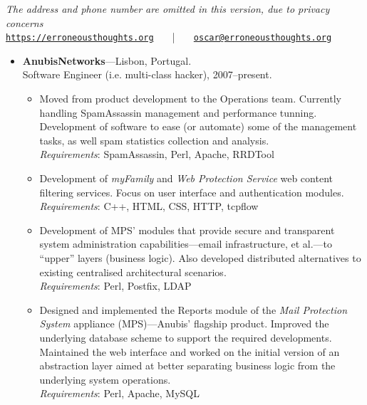 \documentclass[a4paper,9pt]{extarticle}
\newenvironment{topic}[1]
   {{\noindent\large\bfseries\raisebox{0pt}[\height][1ex]{#1}\hrule}%
    \begin{list}{}{%
       \setlength{\leftmargin}{.25cm}}%
    \item[]}
   {\end{list}\medskip}
\newenvironment{header}[1]
   {\centering{\noindent\large\bfseries\raisebox{0pt}[\height][1ex]{\LARGE\bfseries #1}\hrule}%
    \begin{center}}
   {\end{center}\medskip}
\begin{document}
\begin{header}
{Óscar Francisco Godinho Pereira} 
{\emph{The address and phone number are omitted in this version, due to privacy concerns}}\smallskip\\
\texttt{\url{https://erroneousthoughts.org}} \verb+   +|\verb+   + \texttt{\url{oscar@erroneousthoughts.org}}
\end{header}

\begin{topic}{Professional Experience}
  \begin{itemize}
    \item {\bfseries AnubisNetworks}---Lisbon, Portugal.\\
      Software Engineer (i.e. multi-class hacker), 2007--present.
      \begin{itemize}
	\item Moved from product development to the Operations team. Currently 
	  handling SpamAssassin management and performance tunning. Development 
	  of software to ease (or automate) some of the management tasks, as 
	  well spam statistics collection and analysis.\\
	  \emph{Requirements}: SpamAssassin, Perl, Apache, RRDTool
	\item Development of \emph{myFamily} and \emph{Web Protection Service} 
	  web content filtering services. Focus on user interface and 
	  authentication modules.\\
	  \emph{Requirements}: C++, HTML, CSS, HTTP, tcpflow
	\item Development of MPS' modules that provide secure and transparent 
	  system administration capabilities---email infrastructure, et al.---to 
	  ``upper'' layers (business logic). Also developed distributed 
	  alternatives to existing centralised architectural scenarios.\\
	  \emph{Requirements}: Perl, Postfix, LDAP
	\item Designed and implemented the Reports module of the \emph{Mail 
	  Protection System}\textsuperscript{\texttrademark} appliance 
	  (MPS)---Anubis' flagship product. Improved the underlying database 
	  scheme to support the required developments. Maintained the web 
	  interface and worked on the initial version of an abstraction layer 
	  aimed at better separating business logic from the underlying system 
	  operations.\\
	  \emph{Requirements}: Perl, Apache, MySQL
      \end{itemize}
  \end{itemize}
\end{topic}
\end{document}
